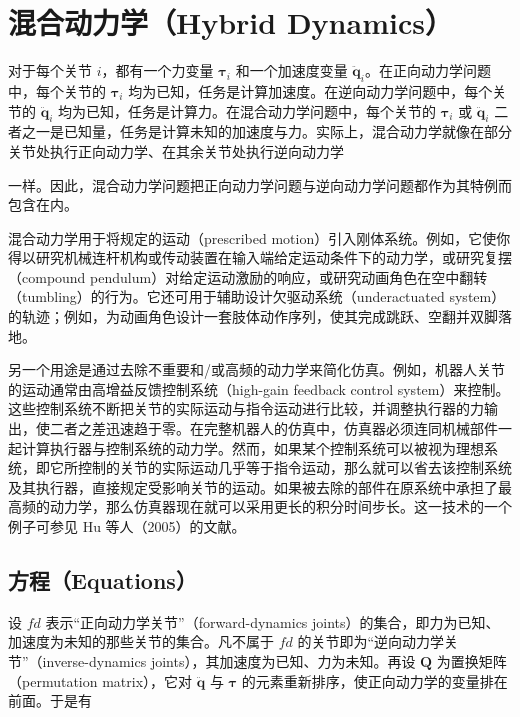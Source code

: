 \documentclass[10pt,a4paper]{book}
\theoremstyle{thmstyle} %
\theoremstyle{defstyle} %
\theoremstyle{prostyle} %
\begin{document}
\section{混合动力学（Hybrid Dynamics）}





对于每个关节 $i$，都有一个力变量 $\boldsymbol{\tau}_{i}$ 和一个加速度变量 $\ddot{\boldsymbol{q}}_{i}$。在正向动力学问题中，每个关节的 $\boldsymbol{\tau}_{i}$ 均为已知，任务是计算加速度。在逆向动力学问题中，每个关节的 $\ddot{\boldsymbol{q}}_{i}$ 均为已知，任务是计算力。在混合动力学问题中，每个关节的 $\boldsymbol{\tau}_{i}$ 或 $\ddot{\boldsymbol{q}}_{i}$ 二者之一是已知量，任务是计算未知的加速度与力。实际上，混合动力学就像在部分关节处执行正向动力学、在其余关节处执行逆向动力学



一样。因此，混合动力学问题把正向动力学问题与逆向动力学问题都作为其特例而包含在内。



混合动力学用于将规定的运动（prescribed motion）引入刚体系统。例如，它使你得以研究机械连杆机构或传动装置在输入端给定运动条件下的动力学，或研究复摆（compound pendulum）对给定运动激励的响应，或研究动画角色在空中翻转（tumbling）的行为。它还可用于辅助设计欠驱动系统（underactuated system）的轨迹；例如，为动画角色设计一套肢体动作序列，使其完成跳跃、空翻并双脚落地。



另一个用途是通过去除不重要和/或高频的动力学来简化仿真。例如，机器人关节的运动通常由高增益反馈控制系统（high-gain feedback control system）来控制。这些控制系统不断把关节的实际运动与指令运动进行比较，并调整执行器的力输出，使二者之差迅速趋于零。在完整机器人的仿真中，仿真器必须连同机械部件一起计算执行器与控制系统的动力学。然而，如果某个控制系统可以被视为理想系统，即它所控制的关节的实际运动几乎等于指令运动，那么就可以省去该控制系统及其执行器，直接规定受影响关节的运动。如果被去除的部件在原系统中承担了最高频的动力学，那么仿真器现在就可以采用更长的积分时间步长。这一技术的一个例子可参见 Hu 等人（2005）的文献。



\subsection{方程（Equations）}





设 $fd$ 表示“正向动力学关节”（forward-dynamics joints）的集合，即力为已知、加速度为未知的那些关节的集合。凡不属于 $fd$ 的关节即为“逆向动力学关节”（inverse-dynamics joints），其加速度为已知、力为未知。再设 $\boldsymbol{Q}$ 为置换矩阵（permutation matrix），它对 $\ddot{\boldsymbol{q}}$ 与 $\boldsymbol{\tau}$ 的元素重新排序，使正向动力学的变量排在前面。于是有
\end{document}
